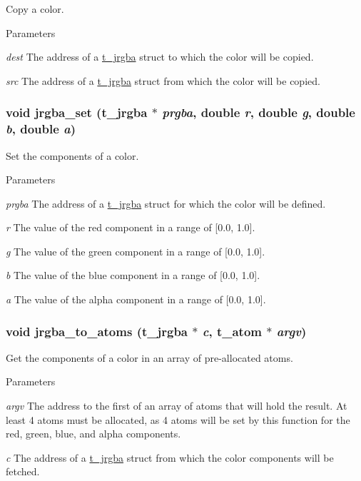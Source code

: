Copy a color. 
\begin{DoxyParams}{Parameters}
\item[{\em dest}]The address of a \hyperlink{structt__jrgba}{t\_\-jrgba} struct to which the color will be copied. \item[{\em src}]The address of a \hyperlink{structt__jrgba}{t\_\-jrgba} struct from which the color will be copied. \end{DoxyParams}
\hypertarget{group__color_ga322f6e69277981f02effe1212affed3c}{
\subsubsection[{jrgba\_\-set}]{\setlength{\rightskip}{0pt plus 5cm}void jrgba\_\-set ({\bf t\_\-jrgba} $\ast$ {\em prgba}, \/  double {\em r}, \/  double {\em g}, \/  double {\em b}, \/  double {\em a})}}
\label{group__color_ga322f6e69277981f02effe1212affed3c}


Set the components of a color. 
\begin{DoxyParams}{Parameters}
\item[{\em prgba}]The address of a \hyperlink{structt__jrgba}{t\_\-jrgba} struct for which the color will be defined. \item[{\em r}]The value of the red component in a range of \mbox{[}0.0, 1.0\mbox{]}. \item[{\em g}]The value of the green component in a range of \mbox{[}0.0, 1.0\mbox{]}. \item[{\em b}]The value of the blue component in a range of \mbox{[}0.0, 1.0\mbox{]}. \item[{\em a}]The value of the alpha component in a range of \mbox{[}0.0, 1.0\mbox{]}. \end{DoxyParams}
\hypertarget{group__color_ga847dd3f1a2640660f12a14fab259afa8}{
\subsubsection[{jrgba\_\-to\_\-atoms}]{\setlength{\rightskip}{0pt plus 5cm}void jrgba\_\-to\_\-atoms ({\bf t\_\-jrgba} $\ast$ {\em c}, \/  {\bf t\_\-atom} $\ast$ {\em argv})}}
\label{group__color_ga847dd3f1a2640660f12a14fab259afa8}


Get the components of a color in an array of pre-\/allocated atoms. 
\begin{DoxyParams}{Parameters}
\item[{\em argv}]The address to the first of an array of atoms that will hold the result. At least 4 atoms must be allocated, as 4 atoms will be set by this function for the red, green, blue, and alpha components. \item[{\em c}]The address of a \hyperlink{structt__jrgba}{t\_\-jrgba} struct from which the color components will be fetched. \end{DoxyParams}
